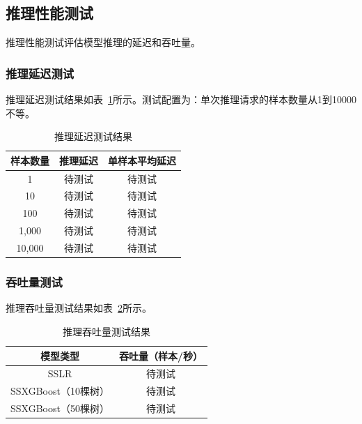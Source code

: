 \subsection{推理性能测试}

推理性能测试评估模型推理的延迟和吞吐量。

\subsubsection{推理延迟测试}

推理延迟测试结果如表~\ref{tab:infer-latency}所示。测试配置为：单次推理请求的样本数量从1到10000不等。

\begin{table}[htbp]
    \centering
    \caption{推理延迟测试结果}
    \label{tab:infer-latency}
    \begin{tabular}{ccc}
        \toprule
        \textbf{样本数量} & \textbf{推理延迟} & \textbf{单样本平均延迟} \\
        \midrule
        1 & 待测试 & 待测试 \\
        10 & 待测试 & 待测试 \\
        100 & 待测试 & 待测试 \\
        1,000 & 待测试 & 待测试 \\
        10,000 & 待测试 & 待测试 \\
        \bottomrule
    \end{tabular}
\end{table}

\subsubsection{吞吐量测试}

推理吞吐量测试结果如表~\ref{tab:infer-throughput}所示。

\begin{table}[htbp]
    \centering
    \caption{推理吞吐量测试结果}
    \label{tab:infer-throughput}
    \begin{tabular}{cc}
        \toprule
        \textbf{模型类型} & \textbf{吞吐量（样本/秒）} \\
        \midrule
        SSLR & 待测试 \\
        SSXGBoost（10棵树） & 待测试 \\
        SSXGBoost（50棵树） & 待测试 \\
        \bottomrule
    \end{tabular}
\end{table}

